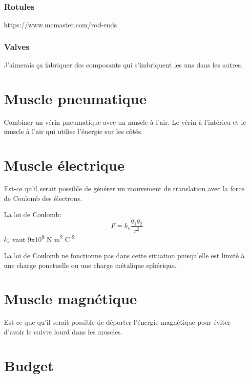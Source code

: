 \documentclass{article}
\newcommand\ala\textsuperscript{}
\begin{document}
\subsubsection{Rotules}
https://www.mcmaster.com/rod-ends
\subsubsection{Valves}

J'aimerais ça fabriquer des composants qui s'imbriquent les uns dans les autres.

\section{Muscle pneumatique}
Combiner un vérin pneumatique avec un muscle à l'air. Le vérin à l'intérieu et le muscle à l'air qui utilise l'énergie sur les côtés.

\section{Muscle électrique}

Est-ce qu'il serait possible de générer un mouvement de translation avec la force de Coulomb des électrons.

La loi de Coulomb:
\begin{equation}
    F = k_e\frac{q_1q_2}{r^2}
\end{equation}{}
$k_e$ vaut 9x10\ala{9} N m\ala{2} C\ala{-2}

La loi de Coulomb ne fonctionne pas dans cette situation puisqu'elle est limité à une charge ponctuelle ou une charge métalique sphérique.

\section{Muscle magnétique}

Est-ce que qu'il serait possible de déporter l'énergie magnétique pour éviter d'avoir le cuivre lourd dans les muscles.

\section{Budget}
\end{document}
